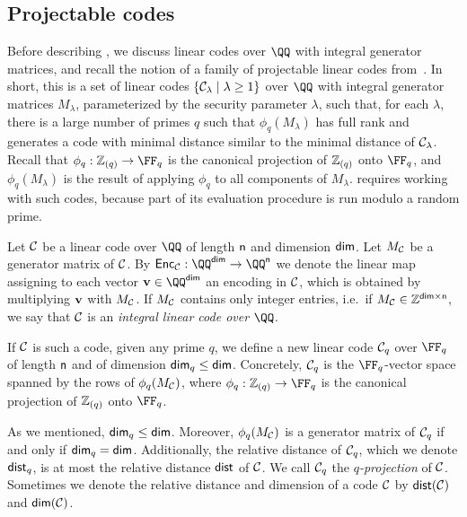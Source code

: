 \documentclass[11pt,letterpaper,usenames,dvipsnames]{article}
\begin{document}
\subsection{Projectable codes}
\label{sec:projectable-codes}

Before describing \zipp, we discuss linear codes over $\QQ$ with integral generator matrices, and recall the notion of a family of projectable linear codes from~\cite{EPRINT:GWHD25}. In short, this is a set of linear codes $\{{\mathcal{C}_{\lambda}}\mid \lambda \geq 1\}$ over $\QQ$ with integral generator matrices $M_\lambda$, parameterized by the security parameter $\lambda$, such that, for each $\lambda$, there is a large number of primes $q$ such that $\phi_q(M_\lambda)$ has full rank and generates a code with minimal distance similar to the minimal distance of ${\mathcal{C}_{\lambda}}$. Recall that $\phi_q:\local{q}\to \FF_q$ is the canonical projection of $\mathbb{Z}_{(q)}$ onto $\FF_q$, and $\phi_q(M_\lambda)$ is the result of applying $\phi_q$ to all components of $M_\lambda$. \zipp requires working with such codes, because part of its evaluation procedure is run modulo a random prime.

Let $\mathcal{C}$ be a linear code over $\QQ$ of length $\mathsf{n}$ and dimension $\mathsf{dim}$.  Let $M_{\mathcal{C}}$ be a generator matrix of $\mathcal{C}$. By $\Enc_{\codelinplain}: \QQ^\codedim \to \QQ^\codelength$ we denote the linear map assigning to each vector $\vv\in \QQ^\codedim$ an encoding in $\mathcal{C}$, which is obtained by multiplying $\mathbf{v}$ with $M_{\mathcal{C}}$. If $M_{\mathcal{C}}$ contains only integer entries, i.e.\ if $M_{\mathcal{C}}\in \mathbb{Z}^{\mathsf{dim}\times \mathsf{n}}$, we say that $\mathcal{C}$ is an \emph{integral linear code over $\QQ$.}
 
If $\mathcal{C}$ is such a code,  given any prime $q$, we define a new linear code $\mathcal{C}_q$ over $\FF_q$ of length $\mathsf{n}$ and of dimension $\mathsf{dim}_q\leq \mathsf{dim}$. Concretely, $\mathcal{C}_q$ is the $\FF_q$-vector space spanned by the rows of $\phi_q(M_{\mathcal{C}})$, where $\phi_q: \local{q} \to \FF_q$ is the canonical projection of $\mathbb{Z}_{(q)}$ onto $\FF_q$. 

As we mentioned, $\mathsf{dim}_q\leq \mathsf{dim}$. Moreover,  $\phi_q(M_{\mathcal{C}})$ is a generator matrix of $\mathcal{C}_q$ if and only if $\mathsf{dim}_q=\mathsf{dim}$. Additionally,  the relative distance of $\mathcal{C}_q$, which we denote $\mathsf{dist}_q$, is at most the relative distance $\mathsf{dist}$ of $\mathcal{C}$. We call $\mathcal{C}_q$ the \emph{$q$-projection} of $\mathcal{C}$. Sometimes we denote the relative distance and dimension of a code $\mathcal{C}$ by $\mathsf{dist}(\mathcal{C})$ and $\mathsf{dim}(\mathcal{C})$.
\end{document}
